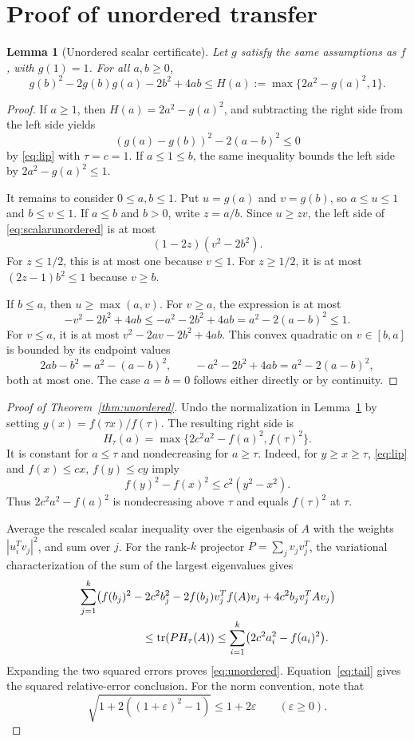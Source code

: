 \documentclass[11pt]{article}
\newtheorem{lemma}[theorem]{Lemma}
\theoremstyle{definition}
\newcommand{\tr}{\operatorname{tr}}
\newcommand{\eps}{\varepsilon}
\begin{document}
\section{Proof of unordered transfer}
\begin{lemma}[Unordered scalar certificate]\label{lem:unorderedscalar}
Let $g$ satisfy the same assumptions as $f$, with $g(1)=1$. For all $a,b\ge0$,
\begin{equation}\label{eq:scalarunordered}
 g(b)^2-2g(b)g(a)-2b^2+4ab
 \le H(a):=\max\{2a^2-g(a)^2,1\}.
\end{equation}
\end{lemma}
\begin{proof}
If $a\ge1$, then $H(a)=2a^2-g(a)^2$, and subtracting the right side from the left side yields
\[
 (g(a)-g(b))^2-2(a-b)^2\le0
\]
by \eqref{eq:lip} with $\tau=c=1$. If $a\le1\le b$, the same inequality bounds the left side by $2a^2-g(a)^2\le1$.

It remains to consider $0\le a,b\le1$. Put $u=g(a)$ and $v=g(b)$, so $a\le u\le1$ and $b\le v\le1$. If $a\le b$ and $b>0$, write $z=a/b$. Since $u\ge zv$, the left side of \eqref{eq:scalarunordered} is at most
\[
 (1-2z)(v^2-2b^2).
\]
For $z\le1/2$, this is at most one because $v\le1$. For $z\ge1/2$, it is at most $(2z-1)b^2\le1$ because $v\ge b$.

If $b\le a$, then $u\ge\max(a,v)$. For $v\ge a$, the expression is at most
\[
 -v^2-2b^2+4ab\le-a^2-2b^2+4ab
 =a^2-2(a-b)^2\le1.
\]
For $v\le a$, it is at most $v^2-2av-2b^2+4ab$. This convex quadratic on $v\in[b,a]$ is bounded by its endpoint values
\[
 2ab-b^2=a^2-(a-b)^2,\qquad
 -a^2-2b^2+4ab=a^2-2(a-b)^2,
\]
both at most one. The case $a=b=0$ follows either directly or by continuity.
\end{proof}

\begin{proof}[Proof of Theorem~\ref{thm:unordered}]
Undo the normalization in Lemma~\ref{lem:unorderedscalar} by setting $g(x)=f(\tau x)/f(\tau)$. The resulting right side is
\[
 H_\tau(a)=\max\{2c^2a^2-f(a)^2,f(\tau)^2\}.
\]
It is constant for $a\le\tau$ and nondecreasing for $a\ge\tau$. Indeed, for $y\ge x\ge\tau$, \eqref{eq:lip} and $f(x)\le cx$, $f(y)\le cy$ imply
\[
 f(y)^2-f(x)^2\le c^2(y^2-x^2).
\]
Thus $2c^2a^2-f(a)^2$ is nondecreasing above $\tau$ and equals $f(\tau)^2$ at $\tau$.

Average the rescaled scalar inequality over the eigenbasis of $A$ with the weights $|u_i^Tv_j|^2$, and sum over $j$. For the rank-$k$ projector $P=\sum_jv_jv_j^T$, the variational characterization of the sum of the largest eigenvalues gives
\begin{align*}
 &\sum_{j=1}^k\bigl(f(b_j)^2-2c^2b_j^2
       -2f(b_j)v_j^Tf(A)v_j+4c^2b_jv_j^TAv_j\bigr)\\
 &\hspace{20mm}\le\tr(PH_\tau(A))
 \le\sum_{i=1}^k\bigl(2c^2a_i^2-f(a_i)^2\bigr).
\end{align*}
Expanding the two squared errors proves \eqref{eq:unordered}. Equation~\eqref{eq:tail} gives the squared relative-error conclusion. For the norm convention, note that
\[
 \sqrt{1+2((1+\eps)^2-1)}\le1+2\eps
 \qquad(\eps\ge0).
\]
\end{proof}
\end{document}
